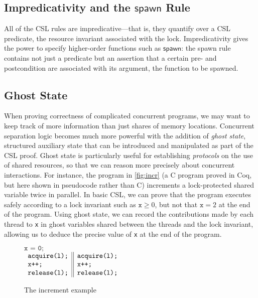 
\subsection{Impredicativity and the $\mathsf{spawn}$ Rule}
All of the CSL rules are impredicative---that is, they quantify over a CSL predicate, the resource invariant associated with the lock.
Impredicativity gives the power to specify higher-order functions such as 
$\mathsf{spawn}$: the \textsf{spawn} rule contains not just a predicate but an assertion that a certain pre- and postcondition are associated with its argument, the function to be spawned.

\subsection{Ghost State}
\label{ghost}
When proving correctness of complicated concurrent programs, we may want to keep track of more information than just shares of memory locations. Concurrent separation logic becomes much more powerful with the addition of \emph{ghost state}, structured auxiliary state that can be introduced and manipulated as part of the CSL proof. Ghost state is particularly useful for establishing \emph{protocols} on the use of shared resources, so that we can reason more precisely about concurrent interactions. For instance, the program in \autoref{fig:incr} (a C program proved in Coq, but here shown in pseudocode rather than C) increments a lock-protected shared variable twice in parallel. In basic CSL, we can prove that the program executes safely according to a lock invariant such as $\texttt{x} \ge 0$, but not that $\texttt{x} = 2$ at the end of the program. Using ghost state, we can record the contributions made by each thread to \texttt{x} in ghost variables shared between the threads and the lock invariant, allowing us to deduce the precise value of \texttt{x} at the end of the program.

\begin{figure}[htb]
\centering
$\texttt{x = 0;}$\\
$\begin{array}{l || l}
\texttt{acquire(l);} & \texttt{acquire(l);}\\
\texttt{x++;} & \texttt{x++;}\\
\texttt{release(l);} & \texttt{release(l);}
\end{array}$
\caption{The increment example}
\label{fig:incr}
\end{figure}

